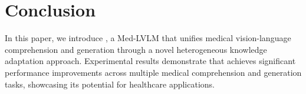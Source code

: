 \section{Conclusion}

In this paper, we introduce \ourmethod{}, a Med-LVLM that unifies medical vision-language comprehension and generation through a novel heterogeneous knowledge adaptation approach.
Experimental results demonstrate that \ourmethod{} achieves significant performance improvements across multiple medical comprehension and generation tasks, showcasing its potential for healthcare applications. 
